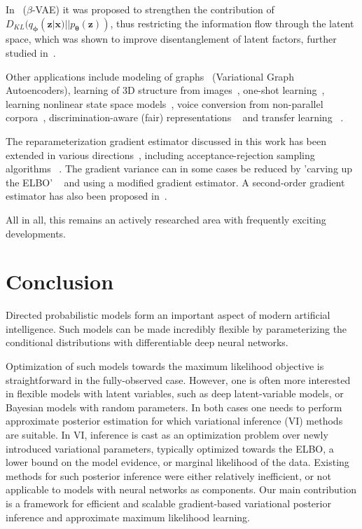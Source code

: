 \documentclass[MAL,biber]{nowfnt} %
\newcommand{\bb}[1]{\mathbf{#1}}
\newcommand{\bx}{\bb{x}}
\newcommand{\bz}{\bb{z}}
\newcommand{\bT}{\boldsymbol{\theta}}
\newcommand{\bphi}{\boldsymbol{\phi}}
\newcommand{\pT}{p_{\bT}}
\newcommand{\qP}{q_{\bphi}}
\begin{document}
In~\citep{higgins2016beta} ($\beta$-VAE) it was proposed to strengthen the contribution of $D_{KL}(\qP(\bz|\bx)||\pT(\bz))$, thus restricting the information flow through the latent space, which was shown to improve disentanglement of latent factors, further studied in~\citep{chen2018isolating}.

Other applications include modeling of graphs~\citep{kipf2016variational} (Variational Graph Autoencoders), learning of 3D structure from images~\citep{rezende2016unsupervised}, one-shot learning~\citep{rezende2016one}, learning nonlinear state space models~\citep{krishnan2017structured}, voice conversion from non-parallel corpora~\citep{hsu2016voice}, discrimination-aware (fair) representations ~\citep{louizos2015variational} and transfer learning ~\citep{edwards2016towards}.

The reparameterization gradient estimator discussed in this work has been extended in various directions~\citep{ruiz2016generalized}, including acceptance-rejection sampling algorithms
~\citep{naesseth2017reparameterization}. The gradient variance can in some cases be reduced by 'carving up the ELBO' ~\citep{hoffman2016elbo,roeder2017sticking} and using a modified gradient estimator. A second-order gradient estimator has also been proposed in~\citep{fan2015fast}.

All in all, this remains an actively researched area with frequently exciting developments.


\chapter{Conclusion}
\label{chap:conclusion}

Directed probabilistic models form an important aspect of modern artificial intelligence. Such models can be made incredibly flexible by parameterizing the conditional distributions with differentiable deep neural networks.

 Optimization of such models towards the maximum likelihood objective is straightforward in the fully-observed case. However, one is often more interested in flexible models with latent variables, such as deep latent-variable models, or Bayesian models with random parameters. In both cases one needs to perform approximate posterior estimation for which variational inference (VI) methods are suitable. 
In VI, inference is cast as an optimization problem over newly introduced variational parameters, typically optimized towards the ELBO, a lower bound on the model evidence, or marginal likelihood of the data.  Existing methods for such posterior inference were either relatively inefficient, or not applicable to models with neural networks as components. Our main contribution is a framework for efficient and scalable gradient-based variational posterior inference and approximate maximum likelihood learning. 
\end{document}
